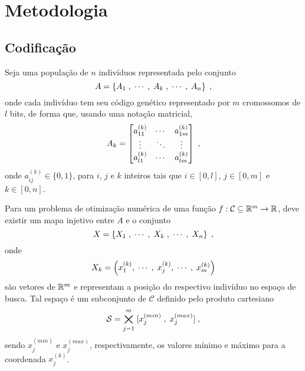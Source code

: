 \chapter{Metodologia}\label{cap_metodologia}

\section{Codificação}

\newcommand{\kth}[2]{{#1}^{(k)}_{#2}}
\newcommand{\kpth}[2]{{#1}^{(k + 1)}_{#2}}
\newcommand{\xmin}[1]{x^{(min)}_{#1}}
\newcommand{\xmax}[1]{x^{(max)}_{#1}}

Seja uma população de $n$ indivíduos representada pelo conjunto
\begin{equation}
  A = \left\{ A_1\;, \;\cdots\;,  \;A_k\;, \;\cdots\;, \;A_n \right\} \;\mathrm{,}
\end{equation}
onde cada indivíduo tem seu código genético representado por $m$ cromossomos
de $l$ bits, de forma que, usando uma notação matricial,
\begin{equation}
  A_k = \left[
    \begin{matrix}
      \kth{a}{11} & \cdots & \kth{a}{1m} \\
      \vdots      & \ddots & \vdots      \\
      \kth{a}{l1} & \cdots & \kth{a}{lm} \\
    \end{matrix}
    \right]
  \mathcomma
\end{equation}
onde $ \kth{a}{ij} \in \{0,1\} $, para $i$, $j$ e $k$ inteiros tais que
$ i \in \left[ 0, l \right] $, $ j \in \left[ 0, m \right] $ e $ k \in \left[ 0, n \right] $.

Para um problema de otimização numérica de uma função $ f : \mathcal{C} \subseteq \mathbb{R}^m \rightarrow \mathbb{R} $,
deve existir um mapa injetivo entre $A$ e o conjunto
\begin{equation}
  X = \left\{ X_1 \; , \;\cdots\;,  \; X_k \; , \;\cdots\;, \; X_n \right\} \;\mathrm{,}
\end{equation}
onde
\begin{equation}
  X_k = \left( \kth{x}{1}, \mathdots, \; \kth{x}{j}, \mathdots, \; \kth{x}{m} \right)
\end{equation}
são vetores de $ \mathbb{R}^m $ e representam a posição do respectivo indivíduo no espaço de busca.
Tal espaço é um subconjunto de $ \mathcal{C} $ definido pelo produto cartesiano
\begin{equation}
  \mathcal{S} = \bigtimes_{j = 1}^m \; [ \xmin{j} \; , \; \xmax{j} ] \mathcomma
\end{equation}
sendo $ \xmin{j} $ e $ \xmax{j} $, respectivamente, os valores mínimo e máximo para
a coordenada $ \kth{x}{j} $.

